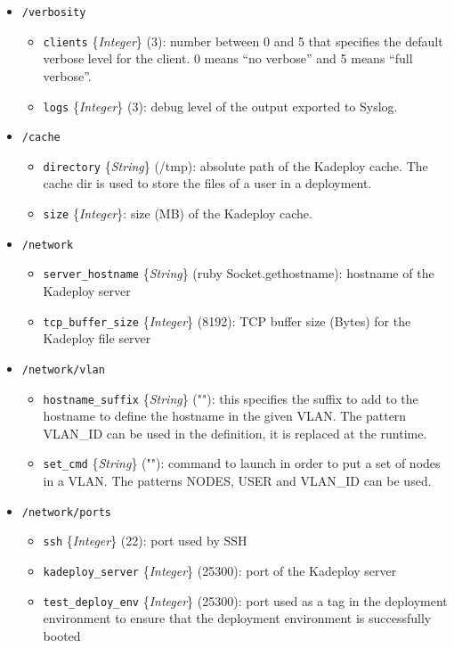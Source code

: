 \documentclass[a4wide,10pt,oneside]{book}
\newcommand{\ypath}[1]{\texttt{#1}}
\newcommand{\yfield}[2]{\texttt{#1} {\small\{{\emph{#2}}\}}:}
\newcommand{\yfieldd}[3]{\texttt{#1} {\small\{{\emph{#2}}\}} {\small(}#3{\small)}:}
\begin{document}
\begin{itemize}
  \item \ypath{/verbosity}
  \begin{itemize}
    \item \yfieldd{clients}{Integer}{3} number between 0 and 5 that specifies the default verbose level for the client. 0 means ``no verbose'' and 5 means ``full verbose''.
    \item \yfieldd{logs}{Integer}{3} debug level of the output exported to Syslog.
  \end{itemize}

  \item \ypath{/cache}
  \begin{itemize}
    \item \yfieldd{directory}{String}{/tmp} absolute path of the Kadeploy cache. The cache dir is used to store the files of a user in a deployment.
    \item \yfield{size}{Integer} size (MB) of the Kadeploy cache.
  \end{itemize}

  \item \ypath{/network}
  \begin{itemize}
    \item \yfieldd{server\_hostname}{String}{ruby Socket.gethostname} hostname of the Kadeploy server
    \item \yfieldd{tcp\_buffer\_size}{Integer}{8192} TCP buffer size (Bytes) for the Kadeploy file server
  \end{itemize}

  \item \ypath{/network/vlan}
  \begin{itemize}
    \item \yfieldd{hostname\_suffix}{String}{""} this specifies the suffix to add to the hostname to define the hostname in the given VLAN. The pattern VLAN\_ID can be used in the definition, it is replaced at the runtime.
    \item \yfieldd{set\_cmd}{String}{""} command to launch in order to put a set of nodes in a VLAN. The patterns NODES, USER and VLAN\_ID can be used.
  \end{itemize}

  \item \ypath{/network/ports}
  \begin{itemize}
    \item \yfieldd{ssh}{Integer}{22} port used by SSH
    \item \yfieldd{kadeploy\_server}{Integer}{25300} port of the Kadeploy server
    \item \yfieldd{test\_deploy\_env}{Integer}{25300} port used as a tag in the deployment environment to ensure that the deployment environment is successfully booted
  \end{itemize}


\end{itemize}
\end{document}
